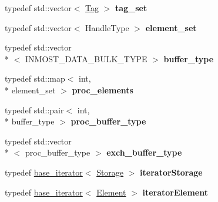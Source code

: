 \begin{DoxyCompactItemize}
\item 
\hypertarget{classINMOST_1_1Mesh_a10e96c6c49203571ef3f391a5e65f5de}{typedef std\-::vector$<$ \hyperlink{classINMOST_1_1Tag}{Tag} $>$ {\bfseries tag\-\_\-set}}\label{classINMOST_1_1Mesh_a10e96c6c49203571ef3f391a5e65f5de}

\item 
\hypertarget{classINMOST_1_1Mesh_a2d97c93d9d3a7bee03180d5cd4372696}{typedef std\-::vector$<$ Handle\-Type $>$ {\bfseries element\-\_\-set}}\label{classINMOST_1_1Mesh_a2d97c93d9d3a7bee03180d5cd4372696}

\item 
\hypertarget{classINMOST_1_1Mesh_a956b5292142d9a206f47a00d3f55b22f}{typedef std\-::vector\\*
$<$ I\-N\-M\-O\-S\-T\-\_\-\-D\-A\-T\-A\-\_\-\-B\-U\-L\-K\-\_\-\-T\-Y\-P\-E $>$ {\bfseries buffer\-\_\-type}}\label{classINMOST_1_1Mesh_a956b5292142d9a206f47a00d3f55b22f}

\item 
\hypertarget{classINMOST_1_1Mesh_ac6ae9912a7097744db789754a90118d5}{typedef std\-::map$<$ int, \\*
element\-\_\-set $>$ {\bfseries proc\-\_\-elements}}\label{classINMOST_1_1Mesh_ac6ae9912a7097744db789754a90118d5}

\item 
\hypertarget{classINMOST_1_1Mesh_ad396ce459946a34ebd8cc5e564ff7e20}{typedef std\-::pair$<$ int, \\*
buffer\-\_\-type $>$ {\bfseries proc\-\_\-buffer\-\_\-type}}\label{classINMOST_1_1Mesh_ad396ce459946a34ebd8cc5e564ff7e20}

\item 
\hypertarget{classINMOST_1_1Mesh_a9cdffb8a47775004fd0b7497d321405c}{typedef std\-::vector\\*
$<$ proc\-\_\-buffer\-\_\-type $>$ {\bfseries exch\-\_\-buffer\-\_\-type}}\label{classINMOST_1_1Mesh_a9cdffb8a47775004fd0b7497d321405c}

\item 
\hypertarget{classINMOST_1_1Mesh_a4d3a085d38c3b8b12d708afef270bca9}{typedef \hyperlink{classINMOST_1_1Mesh_1_1base__iterator}{base\-\_\-iterator}$<$ \hyperlink{classINMOST_1_1Storage}{Storage} $>$ {\bfseries iterator\-Storage}}\label{classINMOST_1_1Mesh_a4d3a085d38c3b8b12d708afef270bca9}

\item 
\hypertarget{classINMOST_1_1Mesh_a37f367f5aa2b0d86940e52a8a93b17e0}{typedef \hyperlink{classINMOST_1_1Mesh_1_1base__iterator}{base\-\_\-iterator}$<$ \hyperlink{classINMOST_1_1Element}{Element} $>$ {\bfseries iterator\-Element}}\label{classINMOST_1_1Mesh_a37f367f5aa2b0d86940e52a8a93b17e0}


\end{DoxyCompactItemize}
